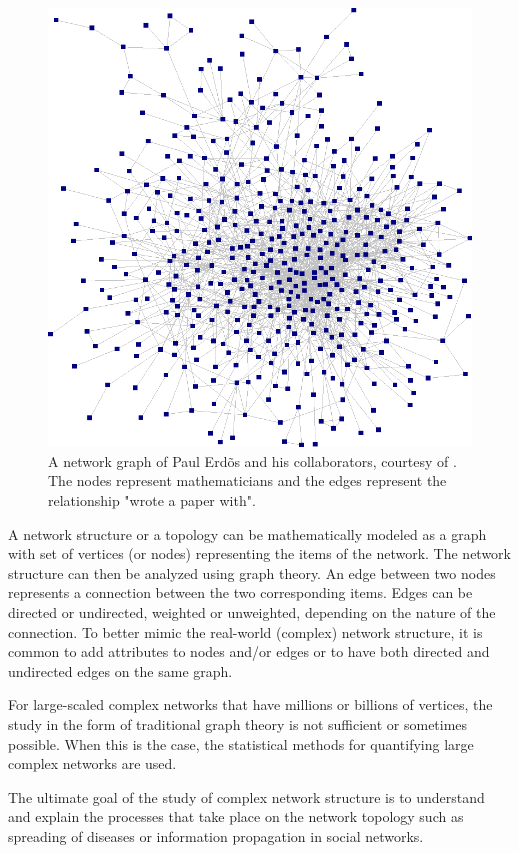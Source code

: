 \documentclass[times, utf8, zavrsni]{fer}
\begin{document}
\begin{figure}[htp]
\centering
\includegraphics[scale = 0.3]{alters2.png}
\caption{A network graph of Paul Erd\~os and his collaborators, courtesy of \cite{krebs}. The nodes represent mathematicians and the edges represent the relationship "wrote a paper with".}
\label{net}
\end{figure}
A network structure or a topology can be mathematically modeled as a graph with set of vertices (or nodes) representing the items of the network. The network structure can then be analyzed using graph theory. An edge between two nodes represents a connection between the two corresponding items. Edges can be directed or undirected, weighted or unweighted, depending  on the nature of the connection.  To better mimic the real-world (complex) network structure, it is common to add attributes to nodes and/or edges or to have both directed and undirected edges on the same graph.

For large-scaled complex networks that have millions or billions of vertices, the study in the form of traditional graph theory is not sufficient or sometimes possible. When this is the case, the statistical methods  for quantifying large complex networks are used. 

The ultimate goal of the study of complex network structure is to understand and explain the processes that take place on the network topology such as spreading of diseases or information propagation in social networks.
\end{document}
